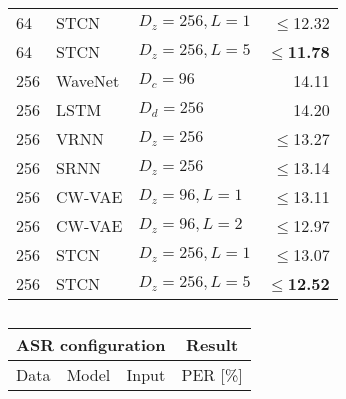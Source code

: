 \begin{table}[t]
\begin{minipage}[t]{.45\textwidth}
\begin{adjustbox}{center, totalheight=0.35\paperheight}
\begin{tabular}[t]{lll|r}
        64 & STCN               & $D_z=256,L=1$               & $\leq$12.32 \\  %
        64 & STCN               & $D_z=256,L=5$               & $\leq$\textbf{11.78} \\
        \midrule
        256 & WaveNet           & $D_c=96$                    & 14.11 \\  %
        256 & LSTM              & $D_d=256$                   & 14.20 \\  %
        256 & VRNN              & $D_z=256$                   & $\leq$13.27 \\  %
        256 & SRNN              & $D_z=256$                   & $\leq$13.14 \\  %
        256 & CW-VAE            & $D_z=96,L=1$                & $\leq$13.11 \\
        256 & CW-VAE            & $D_z=96,L=2$                & $\leq$12.97 \\
        256 & STCN              & $D_z=256,L=1$               & $\leq$13.07 \\  %
        256 & STCN              & $D_z=256,L=5$               & $\leq$\textbf{12.52} \\
        \bottomrule
    \end{tabular}
    \end{adjustbox}
    \vspace{1mm}
    \caption{}
    \vspace{-1mm}
    \label{tab: likelihoods timit}
    \end{minipage}%
    \hfill
    \begin{minipage}[t]{.45\textwidth}
    \centering
    \begin{adjustbox}{center, totalheight=0.35\paperheight}
    \begin{tabular}[t]{cll|c}
        \toprule
        \multicolumn{3}{c}{\bfseries ASR configuration} & \multicolumn{1}{c}{\textbf{Result}} \\
        \midrule
        Data   &  Model           & Input         &  PER [\%]  \\
                \midrule

\end{tabular}
\end{adjustbox}
\end{minipage}
\end{table}
